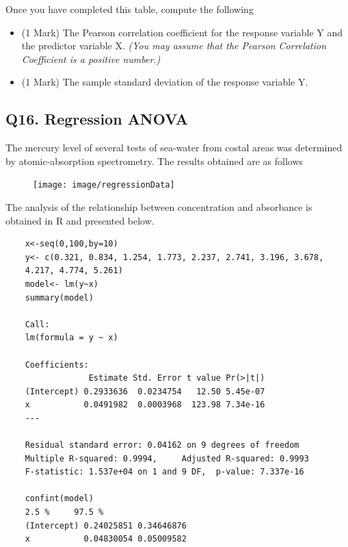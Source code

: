 \documentclass[a4paper,12pt]{article}
\begin{document}
Once you have completed this table, compute the following
\begin{itemize}
	\item (1 Mark) The Pearson correlation coefficient for the response variable Y and the predictor variable X.\textit{ (You may assume that the Pearson Correlation Coefficient is a positive number.)}
	\item (1 Mark) The sample standard deviation of the response variable Y.
\end{itemize}
\newpage
\subsection*{Q16. Regression ANOVA}
The mercury level of several tests of sea-water from costal areas was determined by atomic-absorption spectrometry. The results obtained are as follows

\begin{figure}[h!]
	\centering
	\texttt{[image: image/regressionData]}
\end{figure}

The analysis of the relationship between concentration and absorbance is obtained in R and presented below. 
\begin{framed}
	\begin{verbatim}
	x<-seq(0,100,by=10)
	y<- c(0.321, 0.834, 1.254, 1.773, 2.237, 2.741, 3.196, 3.678, 
	4.217, 4.774, 5.261)
	model<- lm(y~x)
	summary(model)
	
	Call:
	lm(formula = y ~ x)
	
	Coefficients:
	             Estimate Std. Error t value Pr(>|t|)    
	(Intercept) 0.2933636  0.0234754   12.50 5.45e-07 
	x           0.0491982  0.0003968  123.98 7.34e-16 
	---
	
	Residual standard error: 0.04162 on 9 degrees of freedom
	Multiple R-squared: 0.9994,     Adjusted R-squared: 0.9993 
	F-statistic: 1.537e+04 on 1 and 9 DF,  p-value: 7.337e-16 
	
	confint(model)
	2.5 %     97.5 %
	(Intercept) 0.24025851 0.34646876
	x           0.04830054 0.05009582
	
	\end{verbatim}
\end{framed}
\end{document}
